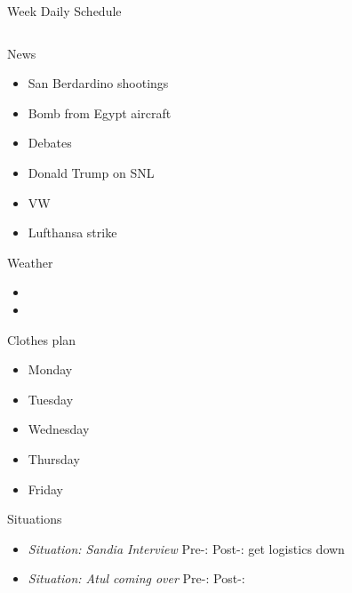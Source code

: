 \begin{frame}
\begin{columns}
\begin{column}{0.50\linewidth}
\begin{block}{Week Daily Schedule}
    \begin{column}{0.20\linewidth}
      \begin{block}{News}
        \begin{itemize} 
          \tiny \item \tiny San Berdardino shootings 
          \tiny \item \tiny Bomb from Egypt aircraft 
        \item \tiny Debates 
        \item \tiny Donald Trump on SNL 
        \item \tiny VW 
        \item \tiny Lufthansa strike  
        \end{itemize}
      \end{block}
      
      \begin{block}{Weather} 
        \begin{itemize}
          \tiny \item \tiny 
        \item \tiny 
        \end{itemize}
      \end{block}  

      \begin{block}{Clothes plan} 
        \begin{itemize}
          \tiny \item \tiny Monday
        \item \tiny Tuesday 
        \item \tiny Wednesday
        \item \tiny Thursday
        \item \tiny Friday 
        \end{itemize} 
      \end{block}

      \begin{block}{Situations}
        \begin{itemize} 
        \item \tiny \textit{Situation: Sandia Interview} Pre-: Post-:
          get logistics down 
          \item \tiny \textit{Situation: Atul coming over} Pre-:
            Post-: 
        \end{itemize} 
      \end{block}


\end{column}
\end{block}
\end{column}
\end{columns}
\end{frame}
